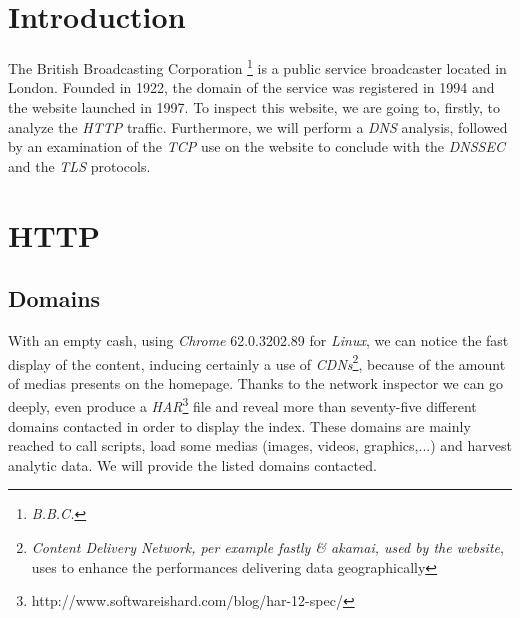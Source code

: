 \documentclass[conference]{IEEEtran}
\begin{document}
\section{Introduction}
    The British Broadcasting Corporation \footnote{\textit{B.B.C.}} is a public service broadcaster located in London. Founded in 1922, the domain of the service was registered in 1994 and the website launched in 1997. To inspect this website, we are going to, firstly, to analyze the \textit{HTTP} traffic. Furthermore, we will perform a \textit{DNS} analysis, followed by an examination of the \textit{TCP} use on the website to conclude with the \textit{DNSSEC} and the \textit{TLS} protocols. 
    
    



\section{HTTP}


\subsection{Domains}
With an empty cash, using \textit{Chrome} 62.0.3202.89 for \textit{Linux}, we can notice the fast display of the content, inducing certainly a use of \textit{CDNs}\footnote{\textit{Content Delivery Network, per example \textit{fastly} & \textit{akamai}, used by the website}, uses to enhance the performances delivering data geographically}, because of the amount of medias presents on the homepage. Thanks to the network inspector we can go deeply, even produce a \textit{HAR}\footnote{http://www.softwareishard.com/blog/har-12-spec/} file and reveal more than seventy-five different domains contacted in order to display the index. These domains are mainly reached to call scripts, load some medias (images, videos, graphics,...) and harvest analytic data. We will provide the listed domains contacted. 
\end{document}
